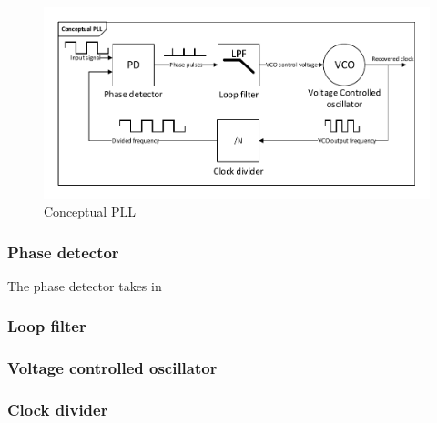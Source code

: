 \begin{figure}[H]
	\centering
	\includegraphics[width=.9\textwidth]{billeder/10technologystudies/conceptualpll}
	\caption{Conceptual PLL}
	\label{fig:conceptualpll}
\end{figure}

\subsubsection{Phase detector}
The phase detector takes in


\subsubsection{Loop filter}

\subsubsection{Voltage controlled oscillator}

\subsubsection{Clock divider}



